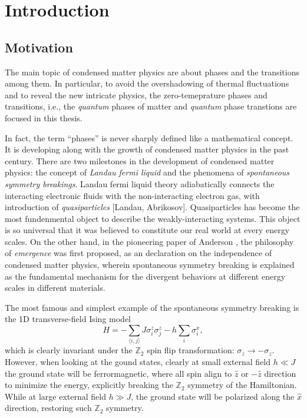\chapter{Introduction}
\section{Motivation}
The main topic of condensed matter physics are about phases and the transitions among them. In particular, to avoid the overshadowing of thermal fluctuations and to reveal the new intricate physics, the zero-temeprature phases and transitions, i.e., the \emph{quantum} phases of matter and \emph{quantum} phase transtions are focused in this thesis.

In fact, the term ``phases'' is never sharply defined like a mathematical concept. It is developing along with the growth of condensed matter physics in the past century. There are two milestones in the development of condensed matter physics: the concept of \emph{Landau fermi liquid} and the phenomena of \emph{spontaneous symmetry breakings}. Landau fermi liquid theory adiabatically connects the interacting electronic fluids with the non-interacting electron gas, with introduction of \emph{quasiparticles} [Landau, Abrikosov]. Quasiparticles has become the most fundenmental object to describe the weakly-interacting systems. This object is so universal that it was believed to constitute our real world at every energy scales. On the other hand, in the pioneering paper of Anderson \cite{anderson1972more}, the philosophy of \emph{emergence} was first proposed, as an declaration on the independence of condensed matter physics, wherein spontaneous symmetry breaking is explained as the fundamental mechanism for the divergent behaviors at different energy scales in different materials.

The most famous and simplest example of the spontaneous symmetry breaking is the 1D transverse-field Ising model
\begin{equation*}
    H=-\sum_{\langle i,j\rangle}J\sigma_i^z\sigma_j^z-h\sum_i\sigma_i^x,
\end{equation*}
which is clearly invariant under the $\mathbb Z_2$ spin flip transformation: $\sigma_z\rightarrow-\sigma_z$. However, when looking at the gound states, clearly at small external field $h\ll J$ the ground state will be ferrormagnetic, where all spin align to $\hat z$ or $-\hat z$ direction to minimize the energy, explicitly breaking the $\mathbb Z_2$ symmetry of the Hamiltonian. While at large external field $h\gg J$, the ground state will be polarized along the $\hat x$ direction, restoring such $\mathbb Z_2$ symmetry.

